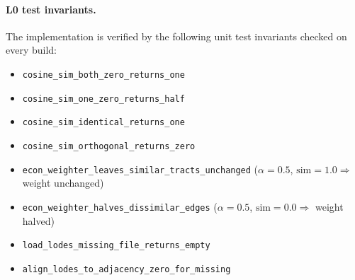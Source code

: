 \paragraph{L0 test invariants.}
The implementation is verified by the following unit test invariants checked
on every build:
\begin{itemize}
  \item \texttt{cosine\_sim\_both\_zero\_returns\_one}
  \item \texttt{cosine\_sim\_one\_zero\_returns\_half}
  \item \texttt{cosine\_sim\_identical\_returns\_one}
  \item \texttt{cosine\_sim\_orthogonal\_returns\_zero}
  \item \texttt{econ\_weighter\_leaves\_similar\_tracts\_unchanged}
    ($\alpha=0.5$, $\mathrm{sim}=1.0 \Rightarrow$ weight unchanged)
  \item \texttt{econ\_weighter\_halves\_dissimilar\_edges}
    ($\alpha=0.5$, $\mathrm{sim}=0.0 \Rightarrow$ weight halved)
  \item \texttt{load\_lodes\_missing\_file\_returns\_empty}
  \item \texttt{align\_lodes\_to\_adjacency\_zero\_for\_missing}
\end{itemize}
